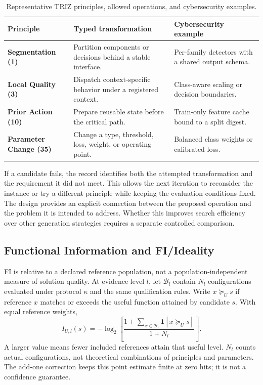 \documentclass[manuscript,screen,nonacm]{acmart}
\begin{document}
\begin{table}[t]
\caption{Representative TRIZ principles, allowed operations, and cybersecurity examples.}
    \label{tab:mapping}
    \centering
    \begin{tabularx}{\linewidth}{>{\raggedright\arraybackslash\bfseries}p{0.90in}>{\raggedright\arraybackslash}p{2.00in}>{\raggedright\arraybackslash}X}
    \toprule
    \rowcolor{trizblue!15}
    \textcolor{triznavy}{Principle} & \textcolor{triznavy}{Typed transformation} & \textcolor{triznavy}{Cybersecurity example} \\
    \midrule
    Segmentation (1) & Partition components or decisions behind a stable interface. & Per-family detectors with a shared output schema. \\
    Local Quality (3) & Dispatch context-specific behavior under a registered context. & Class-aware scaling or decision boundaries. \\
    \rowcolor{trizrow}
    Prior Action (10) & Prepare reusable state before the critical path. & Train-only feature cache bound to a split digest. \\
    Parameter Change (35) & Change a type, threshold, loss, weight, or operating point. & Balanced class weights or calibrated loss. \\
    \bottomrule
\end{tabularx}
\end{table}


If a candidate fails, the record identifies both the attempted transformation and the requirement it did not meet. This allows the next iteration to reconsider the instance or try a different principle while keeping the evaluation conditions fixed. The design provides an explicit connection between the proposed operation and the problem it is intended to address. Whether this improves search efficiency over other generation strategies requires a separate controlled comparison.

\subsection{Functional Information and FI/Ideality}
\label{sec:fi}

FI is relative to a declared reference population, not a
population-independent measure of solution quality. At evidence level $l$,
let $\mathcal{B}_l$ contain $N_l$ configurations evaluated under protocol
$\kappa$ and the same qualification rules. Write $x\succeq_U s$ if reference
$x$ matches or exceeds the useful function attained by candidate $s$.
With equal reference weights,
\begin{equation}
I_{U,l}(s)=-\log_2\!\left[
\frac{1+\sum_{x\in\mathcal{B}_l}\mathbf{1}[x\succeq_U s]}{1+N_l}
\right].
\label{eq:usefulfi}
\end{equation}
A larger value means fewer included references attain that useful level.
$N_l$ counts actual configurations, not theoretical combinations of
principles and parameters. The add-one correction keeps this point
estimate finite at zero hits; it is not a confidence guarantee.
\end{document}
